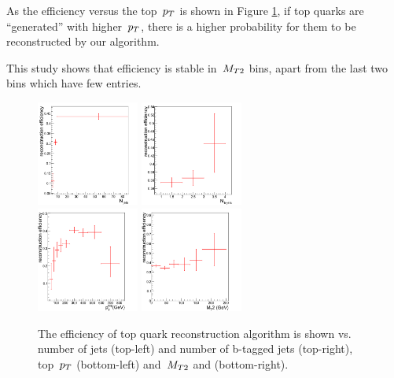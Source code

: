 As the efficiency versus the top $\,p_T$ is shown in Figure \ref{figtopref_eff}, if top quarks are “generated” with higher $\,p_T$, there is a higher probability for them to be reconstructed by our algorithm.

This study shows that efficiency is stable in $\,{M_{T2}}$ bins, apart from the last two bins which have few entries.

\begin{figure}[htbp] 
\centering
    \includegraphics[width=0.3\textwidth]{figs/topNjet.pdf}
    \includegraphics[width=0.3\textwidth]{figs/topNbjet.pdf} \\
    \includegraphics[width=0.3\textwidth]{figs/topPt.pdf}
    \includegraphics[width=0.3\textwidth]{figs/topMT2.pdf}
    \caption{The efficiency of top quark reconstruction algorithm is shown vs. number of jets (top-left) and number of
b-tagged jets (top-right), top $\,p_T$ (bottom-left) and $\,{M_{T2}}$  and (bottom-right).}
    \label{figtopref_eff}
\end{figure}


